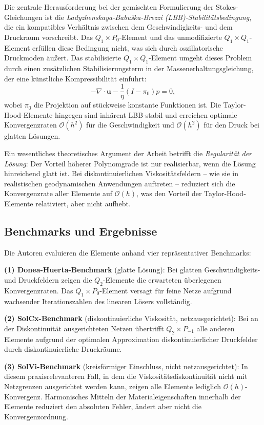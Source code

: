 \documentclass[a4paper,12pt]{article}
\begin{document}
Die zentrale Herausforderung bei der gemischten Formulierung der Stokes-Gleichungen ist die \emph{Ladyzhenskaya-Babu\v{s}ka-Brezzi (LBB)-Stabilitätsbedingung}, die ein kompatibles Verhältnis zwischen dem Geschwindigkeits- und dem Druckraum vorschreibt. Das $Q_1 \times P_0$-Element und das unmodifizierte $Q_1 \times Q_1$-Element erfüllen diese Bedingung nicht, was sich durch oszillatorische Druckmoden äußert. Das stabilisierte $Q_1 \times Q_1$-Element umgeht dieses Problem durch einen zusätzlichen Stabilisierungsterm in der Massenerhaltungsgleichung, der eine künstliche Kompressibilität einführt:
\begin{equation}
    -\nabla \cdot \mathbf{u} - \frac{1}{\eta}(I - \pi_0)p = 0,
\end{equation}
wobei $\pi_0$ die Projektion auf stückweise konstante Funktionen ist. Die Taylor-Hood-Elemente hingegen sind inhärent LBB-stabil und erreichen optimale Konvergenzraten $\mathcal{O}(h^2)$ für die Geschwindigkeit und $\mathcal{O}(h^2)$ für den Druck bei glatten Lösungen.

Ein wesentliches theoretisches Argument der Arbeit betrifft die \emph{Regularität der Lösung}: Der Vorteil höherer Polynomgrade ist nur realisierbar, wenn die Lösung hinreichend glatt ist. Bei diskontinuierlichen Viskositätsfeldern -- wie sie in realistischen geodynamischen Anwendungen auftreten -- reduziert sich die Konvergenzrate aller Elemente auf $\mathcal{O}(h)$, was den Vorteil der Taylor-Hood-Elemente relativiert, aber nicht aufhebt.

\subsection*{Benchmarks und Ergebnisse}

Die Autoren evaluieren die Elemente anhand vier repräsentativer Benchmarks:

\textbf{(1) Donea-Huerta-Benchmark} (glatte Lösung): Bei glatten Geschwindigkeits- und Druckfeldern zeigen die $Q_2$-Elemente die erwarteten überlegenen Konvergenzraten. Das $Q_1 \times P_0$-Element versagt für feine Netze aufgrund wachsender Iterationszahlen des linearen Lösers vollständig.

\textbf{(2) SolCx-Benchmark} (diskontinuierliche Viskosität, netzausgerichtet): Bei an der Diskontinuität ausgerichteten Netzen übertrifft $Q_2 \times P_{-1}$ alle anderen Elemente aufgrund der optimalen Approximation diskontinuierlicher Druckfelder durch diskontinuierliche Druckräume.

\textbf{(3) SolVi-Benchmark} (kreisförmiger Einschluss, nicht netzausgerichtet): In diesem praxisrelevanteren Fall, in dem die Viskositätsdiskontinuität nicht mit Netzgrenzen ausgerichtet werden kann, zeigen alle Elemente lediglich $\mathcal{O}(h)$-Konvergenz. Harmonisches Mitteln der Materialeigenschaften innerhalb der Elemente reduziert den absoluten Fehler, ändert aber nicht die Konvergenzordnung.
\end{document}
